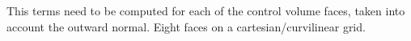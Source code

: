 This terms need to be computed for each of the control volume faces, taken into account the outward normal.
Eight faces on a cartesian/curvilinear grid.


%
